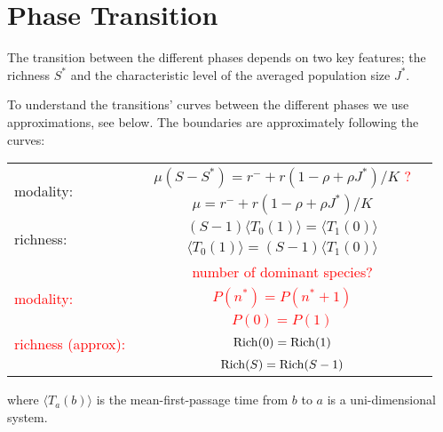 \documentclass[%
 amsmath,amssymb,
 reprint,%
]{revtex4-2}
\begin{document}
 \section{Phase Transition}
 \label{sec:Phase_transition}
The transition between the different phases depends on two key features; the richness $S^*$ and the characteristic level of the averaged population size $J^*$. 

To understand the transitions' curves between the different phases we use approximations, see below.  The boundaries are approximately following the curves:
\begin{center}
\begin{tabular}{lccc}
\hline
\multirow{2}{4em}{modality:} & &
      $\mu(S-S^*)=r^-+r(1-\rho+\rho J^*)/K$   \textcolor{red}{?} \\ &
     & $\mu=r^-+r(1-\rho+\rho J^*)/K$   \\
    \hline 
    \multirow{2}{4em}{richness:}  & & $(S-1){\langle T_0(1) \rangle }={\langle T_1(0) \rangle}$ \\ &
    & ${\langle T_0(1) \rangle }=(S-1){\langle T_1(0) \rangle}$
\\
\hline
& & \textcolor{red}{number of dominant species? } \\
\hline
\textcolor{red}{modality:}& & \textcolor{red}{$P(n^*)=P(n^*+1)$}  \\ & & \textcolor{red}{$P(0)=P(1)$}  \\
\textcolor{red}{richness (approx):}& & \textcolor{red}{${\rm Rich}(0)={\rm Rich}(1)$}  \\
& & \textcolor{red}{${\rm Rich}(S)={\rm Rich}(S-1)$} \\
\hline
\end{tabular}    
\end{center}
%
where $\langle T_{a}(b)\rangle $ is the mean-first-passage time from $b$ to $a$ is a uni-dimensional system.
\end{document}
